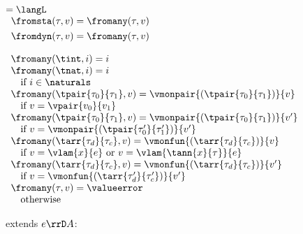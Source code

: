 \begin{flushleft}

\begin{minipage}[t]{0.5\textwidth}
 $= \langL$\\

\medskip
$\begin{array}{l}
  \fromsta(\tau, v) = \fromany(\tau, v)
\\[0.8ex]
  \fromdyn(\tau, v) = \fromany(\tau, v)
\end{array}$
\end{minipage}%
\begin{minipage}[t]{0.5\textwidth}
$\begin{array}{l}
  \fromany(\tint, i) = i
\\
  \fromany(\tnat, i) = i
\\ \mbox{\quad if $i \in \naturals$}
\\
  \fromany(\tpair{\tau_0}{\tau_1}, v) = \vmonpair{(\tpair{\tau_0}{\tau_1})}{v}
\\ \mbox{\quad if $v = \vpair{v_0}{v_1}$}
\\
  \fromany(\tpair{\tau_0}{\tau_1}, v) = \vmonpair{(\tpair{\tau_0}{\tau_1})}{v'}
\\ \mbox{\quad if $v = \vmonpair{(\tpair{\tau_0'}{\tau_1'})}{v'}$}
\\
  \fromany(\tarr{\tau_d}{\tau_c}, v) = \vmonfun{(\tarr{\tau_d}{\tau_c})}{v}
\\ \mbox{\quad if $v = \vlam{x}{e}$ or $v = \vlam{\tann{x}{\tau}}{e}$}
\\
  \fromany(\tarr{\tau_d}{\tau_c}, v) = \vmonfun{(\tarr{\tau_d}{\tau_c})}{v'}
\\ \mbox{\quad if $v = \vmonfun{(\tarr{\tau_d'}{\tau_c'})}{v'}$}
\\
  \fromany(\tau, v) = \valueerror
\\ \mbox{\quad otherwise}
\end{array}$
\end{minipage}

\medskip
\begin{minipage}[t]{0.5\textwidth}
 extends $e \rrD A$:
\begin{mathpar}



\end{mathpar}
\end{minipage}
\end{flushleft}
